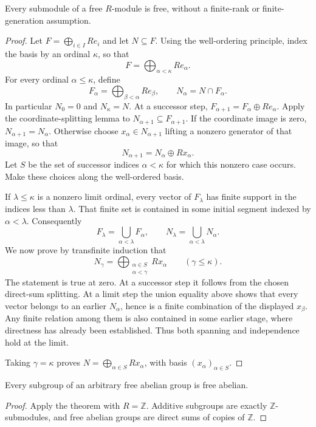 \begin{theorem}\label{thm-arbitrary-rank-submodule}
Every submodule of a free $R$-module is free, without a finite-rank or finite-generation assumption.
\end{theorem}
\begin{proof}\label{proof-arbitrary-rank-submodule}
Let $F=\bigoplus_{i\in I}Re_i$ and let $N\subseteq F$. Using the well-ordering principle, index the basis by an ordinal $\kappa$, so that
\[
F=\bigoplus_{\alpha<\kappa}Re_\alpha.
\]
For every ordinal $\alpha\le\kappa$, define
\[
F_\alpha=\bigoplus_{\beta<\alpha}Re_\beta,
\qquad N_\alpha=N\cap F_\alpha.
\]
In particular $N_0=0$ and $N_\kappa=N$. At a successor step, $F_{\alpha+1}=F_\alpha\oplus Re_\alpha$. Apply the coordinate-splitting lemma to $N_{\alpha+1}\subseteq F_{\alpha+1}$. If the coordinate image is zero, $N_{\alpha+1}=N_\alpha$. Otherwise choose $x_\alpha\in N_{\alpha+1}$ lifting a nonzero generator of that image, so that
\[
N_{\alpha+1}=N_\alpha\oplus Rx_\alpha.
\]
Let $S$ be the set of successor indices $\alpha<\kappa$ for which this nonzero case occurs. Make these choices along the well-ordered basis.

If $\lambda\le\kappa$ is a nonzero limit ordinal, every vector of $F_\lambda$ has finite support in the indices less than $\lambda$. That finite set is contained in some initial segment indexed by $\alpha<\lambda$. Consequently
\[
F_\lambda=\bigcup_{\alpha<\lambda}F_\alpha,
\qquad N_\lambda=\bigcup_{\alpha<\lambda}N_\alpha.
\]
We now prove by transfinite induction that
\[
N_\gamma=\bigoplus_{\substack{\alpha\in S\\\alpha<\gamma}}Rx_\alpha
\qquad(\gamma\le\kappa).
\]
The statement is true at zero. At a successor step it follows from the chosen direct-sum splitting. At a limit step the union equality above shows that every vector belongs to an earlier $N_\alpha$, hence is a finite combination of the displayed $x_\beta$. Any finite relation among them is also contained in some earlier stage, where directness has already been established. Thus both spanning and independence hold at the limit.

Taking $\gamma=\kappa$ proves $N=\bigoplus_{\alpha\in S}Rx_\alpha$, with basis $(x_\alpha)_{\alpha\in S}$.
\end{proof}

\begin{corollary}\label{cor-subgroups-free-abelian}
Every subgroup of an arbitrary free abelian group is free abelian.
\end{corollary}
\begin{proof}\label{proof-subgroups-free-abelian}
Apply the theorem with $R=\mathbb Z$. Additive subgroups are exactly $\mathbb Z$-submodules, and free abelian groups are direct sums of copies of $\mathbb Z$.
\end{proof}

